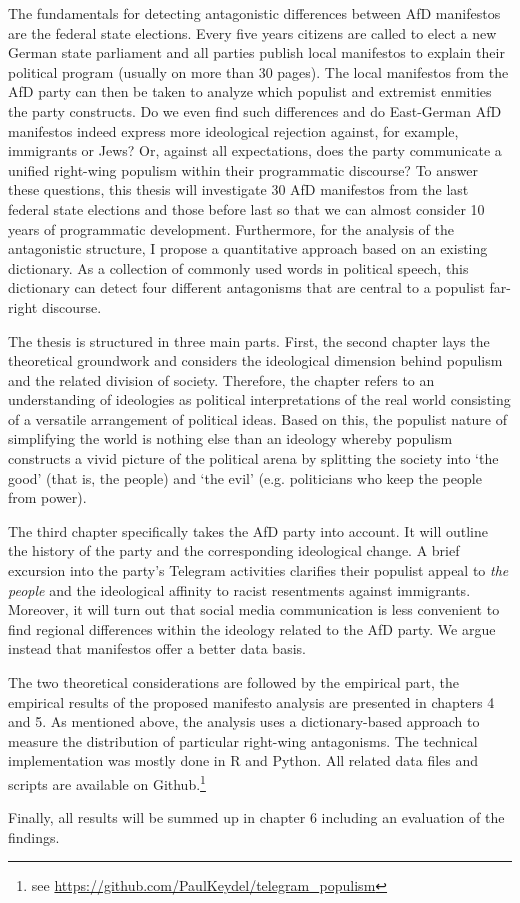 \documentclass[a4paper]{scrreprt}
\begin{document}
The fundamentals for detecting antagonistic differences between AfD manifestos are the federal state elections. Every five years citizens are called to elect a new German state parliament and all parties publish local manifestos to explain their political program (usually on more than 30 pages). The local manifestos from the AfD party can then be taken to analyze which populist and extremist enmities the party constructs. Do we even find such differences and do East-German AfD manifestos indeed express more ideological rejection against, for example, immigrants or Jews? Or, against all expectations, does the party communicate a unified right-wing populism within their programmatic discourse? To answer these questions, this thesis will investigate 30 AfD manifestos from the last federal state elections and those before last so that we can almost consider 10 years of programmatic development. Furthermore, for the analysis of the antagonistic structure, I propose a quantitative approach based on an existing dictionary. As a collection of commonly used words in political speech, this dictionary can detect four different antagonisms that are central to a populist far-right discourse.\par
The thesis is structured in three main parts. First, the second chapter lays the theoretical groundwork and considers the ideological dimension behind populism and the related division of society. Therefore, the chapter refers to an understanding of ideologies as political interpretations of the real world consisting of a versatile arrangement of political ideas. Based on this, the populist nature of simplifying the world is nothing else than an ideology whereby populism constructs a vivid picture of the political arena by splitting the society into `the good' (that is, the people) and `the evil' (e.g. politicians who keep the people from power).\par
The third chapter specifically takes the AfD party into account. It will outline the history of the party and the corresponding ideological change. A brief excursion into the party's Telegram activities clarifies their populist appeal to {\em the people} and the ideological affinity to racist resentments against immigrants. Moreover, it will turn out that social media communication is less convenient to find regional differences within the ideology related to the AfD party. We argue instead that manifestos offer a better data basis.\par
The two theoretical considerations are followed by the empirical part, the empirical results of the proposed manifesto analysis are presented in chapters 4 and 5. As mentioned above, the analysis uses a dictionary-based approach to measure the distribution of particular right-wing antagonisms. The technical implementation was mostly done in R and Python. All related data files and scripts are available on Github.\footnote{see \url{https://github.com/PaulKeydel/telegram_populism}}\par
Finally, all results will be summed up in chapter 6 including an evaluation of the findings.
\end{document}
